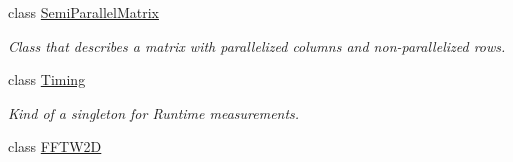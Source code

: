 \begin{DoxyCompactItemize}
class \hyperlink{classnatrium_1_1SemiParallelMatrix}{SemiParallelMatrix}
\begin{DoxyCompactList}\small\item\em Class that describes a matrix with parallelized columns and non-\/parallelized rows. \item\end{DoxyCompactList}\item 
class \hyperlink{classnatrium_1_1Timing}{Timing}
\begin{DoxyCompactList}\small\item\em Kind of a singleton for Runtime measurements. \item\end{DoxyCompactList}\item 
class \hyperlink{classnatrium_1_1FFTW2D}{FFTW2D}
\end{DoxyCompactItemize}

